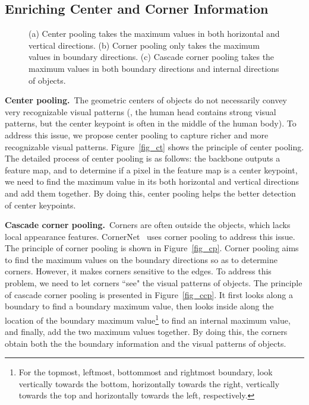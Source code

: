 \documentclass[10pt,twocolumn,letterpaper]{article}
\begin{document}
\subsection{Enriching Center and Corner Information}\label{Enriching}

\begin{figure}[tb]
  \centering 
  \vspace{-2ex}
  \caption{(a) Center pooling takes the maximum values in both horizontal and vertical directions. (b) Corner pooling only takes the maximum values in boundary directions. (c) Cascade corner pooling takes the maximum values in both boundary directions and internal directions of objects.} 
  \label{fig_cornerpooling}
  \vspace{-3ex}
\end{figure}


\noindent\textbf{Center pooling.}~The geometric centers of objects do not necessarily convey very recognizable visual patterns (\eg, the human head contains strong visual patterns, but the center keypoint is often in the middle of the human body). To address this issue, we propose center pooling to capture richer and more recognizable visual patterns. Figure~\ref{fig_ct} shows the principle of center pooling. The detailed process of center pooling is as follows: the backbone outputs a feature map, and to determine if a pixel in the feature map is a center keypoint, we need to find the maximum value in its both horizontal and vertical directions and add them together. By doing this, center pooling helps the better detection of center keypoints.

\vspace{1ex}\noindent\textbf{Cascade corner pooling.}~Corners are often outside the objects, which lacks local appearance features. CornerNet~\cite{law2018cornernet} uses corner pooling to address this issue. The principle of corner pooling is shown in Figure~\ref{fig_cp}. Corner pooling aims to find the maximum values on the boundary directions so as to determine corners. However, it makes corners sensitive to the edges. To address this problem, we need to let corners ``see" the visual patterns of objects. The principle of cascade corner pooling is presented in Figure~\ref{fig_ccp}. It first looks along a boundary to find a boundary maximum value, then looks inside along the location of the boundary maximum value\footnote{For the topmost, leftmost, bottommost and rightmost boundary, look vertically towards the bottom, horizontally towards the right, vertically towards the top and horizontally towards the left, respectively.} to find an internal maximum value, and finally, add the two maximum values together. By doing this, the corners obtain both the the boundary information and the visual patterns of objects.
\end{document}
